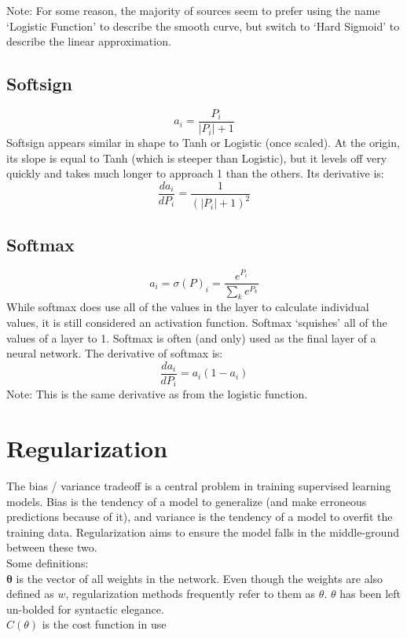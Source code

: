 \documentclass[fleqn]{article}
\begin{document}
Note: For some reason, the majority of sources seem to prefer using
the name `Logistic Function' to describe the smooth curve, but switch to
`Hard Sigmoid' to describe the linear approximation.

\subsection{Softsign}
\[ a_i = \frac{P_i}{|P_i| + 1} \]
Softsign appears similar in shape to Tanh or Logistic (once scaled). At
the origin, its slope is equal to Tanh (which is steeper than Logistic),
but it levels off very quickly and takes much longer to approach 1 than
the others.
Its derivative is:
\[ \frac{d a_i}{d P_i} = \frac{1}{(|P_i|+1)^2} \]

\subsection{Softmax}
\[ a_i = \sigma(P)_i = \frac{e^{P_i}}{{\sum}_k e^{P_k}} \]
While softmax does use all of the values in the layer to calculate
individual values, it is still considered an activation function. Softmax
`squishes' all of the values of a layer to 1. Softmax is often (and only)
used as the final layer of a neural network. The derivative of softmax is:
\[ \frac{d a_i}{d P_i} = a_i(1 - a_i) \]
Note: This is the same derivative as from the logistic function.

\section{Regularization}

The bias / variance tradeoff is a central problem in training supervised
learning models. Bias is the tendency of a model to generalize (and
make erroneous predictions because of it), and variance is the tendency
of a model to overfit the training data. Regularization aims to ensure the
model falls in the middle-ground between these two.\\
Some definitions:\\
\hspace*{6mm} $\bm{\theta}$ is the vector of all weights in the network.
	Even though the weights are also defined as $w$, regularization
	methods frequently refer to them as $\theta$. $\theta$ has been left
	un-bolded for syntactic elegance.\\
\hspace*{6mm} $C(\theta)$ is the cost function in use
\end{document}
